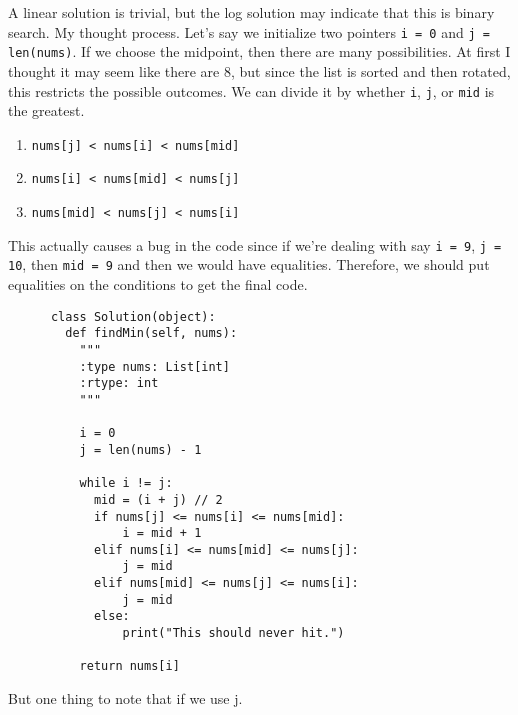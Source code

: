 \documentclass{article}
\begin{document}
  \begin{example}
    A linear solution is trivial, but the log solution may indicate that this is binary search. My thought process. Let's say we initialize two pointers \texttt{i = 0}  and \texttt{j = len(nums)}. If we choose the midpoint, then there are many possibilities. At first I thought it may seem like there are 8, but since the list is sorted and then rotated, this restricts the possible outcomes. We can divide it by whether \texttt{i}, \texttt{j}, or \texttt{mid} is the greatest. 
    \begin{enumerate}
      \item \texttt{nums[j] < nums[i] < nums[mid]}  
      \item \texttt{nums[i] < nums[mid] < nums[j]} 
      \item \texttt{nums[mid] < nums[j] < nums[i]} 
    \end{enumerate}
    This actually causes a bug in the code since if we're dealing with say \texttt{i = 9}, \texttt{j = 10}, then \texttt{mid = 9} and then we would have equalities. Therefore, we should put equalities on the conditions to get the final code. 
    \begin{lstlisting}
      class Solution(object):
        def findMin(self, nums):
          """
          :type nums: List[int]
          :rtype: int
          """ 
          
          i = 0 
          j = len(nums) - 1

          while i != j: 
            mid = (i + j) // 2 
            if nums[j] <= nums[i] <= nums[mid]: 
                i = mid + 1 
            elif nums[i] <= nums[mid] <= nums[j]: 
                j = mid 
            elif nums[mid] <= nums[j] <= nums[i]: 
                j = mid
            else: 
                print("This should never hit.")

          return nums[i] 
    \end{lstlisting}
  \end{example}

  But one thing to note that if we use j. 
\end{document}
